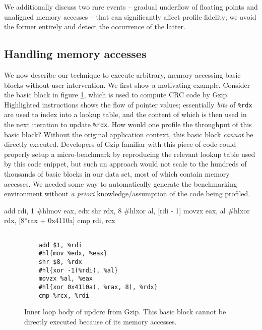 We additionally discuss two rare events --
gradual underflow of floating points and unaligned memory accesses -- 
that can significantly affect profile fidelity;
we avoid the former entirely and detect the occurrence of the latter.

\subsection{Handling memory accesses}\label{sec:mapping}
We now describe our technique to execute arbitrary, memory-accessing basic blocks
without user intervention.
We first show a motivating example.
Consider the basic block in figure \ref{fig:mem-ex},
which is used to compute CRC code by Gzip.
Highlighted instructions shows the flow of pointer values;
essentially \textit{bits} of \verb|%rdx| are used to index into a lookup table, 
and the content of which is then used in the next iteration to 
update \verb|%rdx|.
How would one profile the throughput of this basic block?
Without the original application context,
this basic block \textit{cannot} be directly executed.
Developers of Gzip familiar with this piece of code could 
properly setup a micro-benchmark by reproducing the
relevant lookup table used by this code snippet,
but such an approach would not scale to the hundreds of 
thousands of basic blocks in our data set, most of which contain memory accesses.
We needed some way to automatically generate the benchmarking environment
without \textit{a priori} knowledge/assumption of the code being profiled.

    add rdi, 1
    #hl{mov eax, edx}
    shr rdx, 8
    #hl{xor al, [rdi - 1]}
    movzx eax, al
    #hl{xor rdx, [8*rax + 0x4110a]}
    cmp rdi, rcx
\fi
\begin{figure}[h]
\begin{Verbatim}[commandchars=\#\{\}]
    
    add $1, %rdi
    #hl{mov %edx, %eax}
    shr $8, %rdx
    #hl{xor -1(%rdi), %al}
    movzx %al, %eax
    #hl{xor 0x4110a(, %rax, 8), %rdx}
    cmp %rcx, %rdi
\end{Verbatim}
\caption{Inner loop body of updcrc from Gzip.
This basic block cannot be directly executed because
of its memory accesses.}
\label{fig:mem-ex}
\end{figure}

